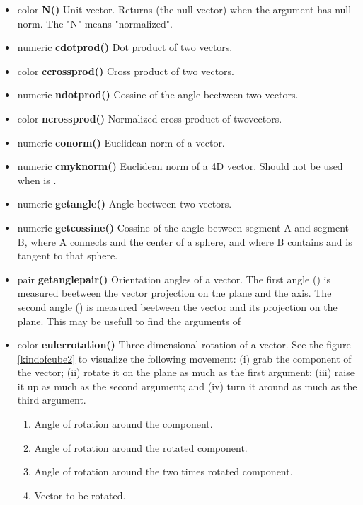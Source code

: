 \begin{itemize}
\item color {\bfseries N()} Unit vector. Returns
 (the null vector) when the argument has
null norm. The "N" means "normalized".
\item numeric {\bfseries cdotprod()} Dot product of two
vectors.
\item color {\bfseries ccrossprod()} Cross product of two
vectors.
\item numeric {\bfseries ndotprod()} Cossine of the angle
beetween two vectors.
\item color {\bfseries ncrossprod()} Normalized cross product
of twovectors.
\item numeric {\bfseries conorm()} Euclidean norm of a
vector.
\item numeric {\bfseries cmyknorm()} Euclidean norm of a
4D vector. Should not be used when  is .
\item numeric {\bfseries getangle()} Angle beetween two
vectors.
\item numeric {\bfseries getcossine()} Cossine of the angle between
  segment A and segment B, where A connects  and the center of
  a sphere, and where B contains  and is tangent to that sphere.
\item pair {\bfseries getanglepair()} Orientation angles
of a vector. The first angle () is
measured beetween the vector projection on the 
plane and the  axis. The second angle
() is measured
beetween the vector and its projection on the 
plane. This may be usefull to find the arguments of
\item color {\bfseries eulerrotation()} Three-dimensional
rotation of a vector. See the figure \ref{kindofcube2} to visualize
the following movement: (i) grab the  component of the
vector; (ii) rotate it on the  plane as
much as the first argument; 
(iii) raise it up as much as the second argument; and
(iv) turn it around as much as the third argument.
\begin{enumerate}
\item {} Angle of rotation around the
 component.
\item {} Angle of rotation around the
rotated  component.
\item {} Angle of rotation around the
two times rotated  component.
\item {} Vector to be rotated.

\end{enumerate}
\end{itemize}
